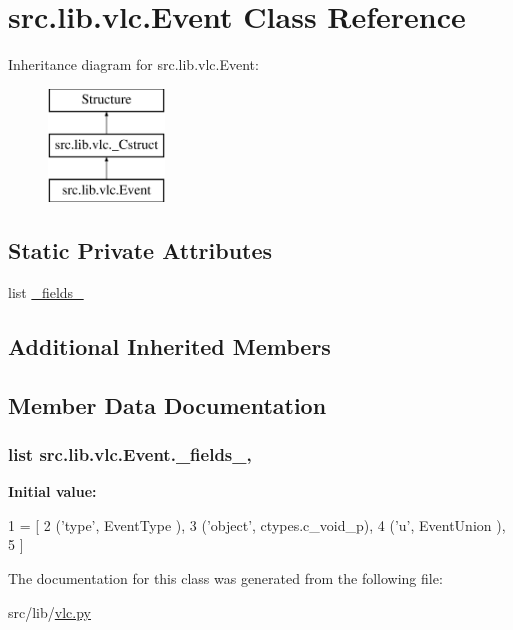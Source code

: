 \hypertarget{classsrc_1_1lib_1_1vlc_1_1Event}{}\section{src.\+lib.\+vlc.\+Event Class Reference}
\label{classsrc_1_1lib_1_1vlc_1_1Event}
Inheritance diagram for src.\+lib.\+vlc.\+Event\+:\begin{figure}[H]
\begin{center}
\leavevmode
\includegraphics[height=3.000000cm]{classsrc_1_1lib_1_1vlc_1_1Event}
\end{center}
\end{figure}
\subsection*{Static Private Attributes}
\begin{DoxyCompactItemize}
\item 
list \hyperlink{classsrc_1_1lib_1_1vlc_1_1Event_aa96b52e8350c1c283c290cf719e6b417}{\+\_\+fields\+\_\+}
\end{DoxyCompactItemize}
\subsection*{Additional Inherited Members}


\subsection{Member Data Documentation}
\hypertarget{classsrc_1_1lib_1_1vlc_1_1Event_aa96b52e8350c1c283c290cf719e6b417}{}
\subsubsection[{\+\_\+fields\+\_\+}]{\setlength{\rightskip}{0pt plus 5cm}list src.\+lib.\+vlc.\+Event.\+\_\+fields\+\_\+\hspace{0.3cm}{\ttfamily [static]}, {\ttfamily [private]}}\label{classsrc_1_1lib_1_1vlc_1_1Event_aa96b52e8350c1c283c290cf719e6b417}
{\bfseries Initial value\+:}
\begin{DoxyCode}
1 = [
2         (\textcolor{stringliteral}{'type'},   EventType      ),
3         (\textcolor{stringliteral}{'object'}, ctypes.c\_void\_p),
4         (\textcolor{stringliteral}{'}\textcolor{stringliteral}{u',      EventUnion     ),}
5 \textcolor{stringliteral}{    ]}
\end{DoxyCode}


The documentation for this class was generated from the following file\+:\begin{DoxyCompactItemize}
\item 
src/lib/\hyperlink{vlc_8py}{vlc.\+py}\end{DoxyCompactItemize}
